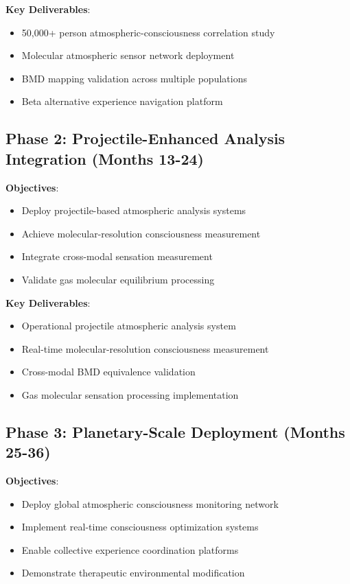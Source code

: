 \documentclass[12pt,a4paper]{article}
\begin{document}
\textbf{Key Deliverables}:
\begin{itemize}
\item 50,000+ person atmospheric-consciousness correlation study
\item Molecular atmospheric sensor network deployment
\item BMD mapping validation across multiple populations  
\item Beta alternative experience navigation platform
\end{itemize}

\subsection{Phase 2: Projectile-Enhanced Analysis Integration (Months 13-24)}

\textbf{Objectives}:
\begin{itemize}
\item Deploy projectile-based atmospheric analysis systems
\item Achieve molecular-resolution consciousness measurement
\item Integrate cross-modal sensation measurement
\item Validate gas molecular equilibrium processing
\end{itemize}

\textbf{Key Deliverables}:
\begin{itemize}
\item Operational projectile atmospheric analysis system
\item Real-time molecular-resolution consciousness measurement
\item Cross-modal BMD equivalence validation
\item Gas molecular sensation processing implementation
\end{itemize}

\subsection{Phase 3: Planetary-Scale Deployment (Months 25-36)}

\textbf{Objectives}:
\begin{itemize}
\item Deploy global atmospheric consciousness monitoring network
\item Implement real-time consciousness optimization systems
\item Enable collective experience coordination platforms
\item Demonstrate therapeutic environmental modification
\end{itemize}
\end{document}
